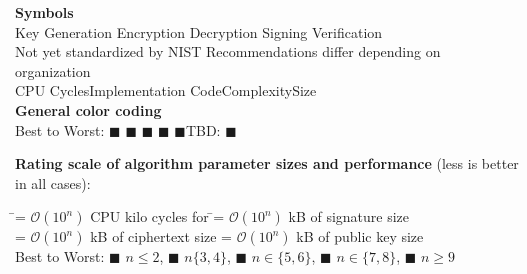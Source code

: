 \documentclass[11pt,english,a4paper, landscape]{scrartcl}
\begin{document}
	\begin{minipage}[t]{0.34\textwidth} %
		\tiny
		{\bfseries  Symbols}\\[0.5\baselineskip]
		\textcolor{themegreydark}{\faKey}\quad Key Generation\quad
		\textcolor{themegreydark}{\faLock}\quad Encryption\quad
		\textcolor{themegreydark}{\faUnlock}\quad Decryption\quad
		\textcolor{themegreydark}{\faPen}\quad Signing\quad
		\textcolor{themegreydark}{\faQuestionCircle}\quad Verification\\
		\textcolor{themegreydark}{\faCalendar}\quad Not yet standardized by NIST\quad
		\textcolor{themegreydark}{\faExclamationCircle}\quad Recommendations differ depending on organization\\
		\textcolor{themegreydark}{\faMicrochip}\quad CPU Cycles\quad\textcolor{themegreydark}{\faCode}\quad Implementation Code\quad{}\quad Complexity\quad{}\quad Size\\[0.25\baselineskip]
		{\bfseries  General color coding}\\[0.5\baselineskip]
		Best to Worst: \textcolor{themegreen}{$\blacksquare$} \textcolor{themeyellow}{$\blacksquare$} \textcolor{themeorange}{$\blacksquare$} \textcolor{themered}{$\blacksquare$} \textcolor{themered!65!black}{$\blacksquare$}\quad TBD: \textcolor{themeblue}{$\blacksquare$}
	\end{minipage}
	\hfill
	\begin{minipage}[t]{0.32\textwidth} %
		\tiny
		{\bfseries Rating scale of algorithm parameter sizes and performance} (less is better in all cases):
		\vspace{-0.75\baselineskip}
		\begin{tabbing}
			\== $\mathcal{O}(10^n)$ CPU kilo cycles for \faAsterisk\hspace{1cm}
			\== $\mathcal{O}(10^n)$ kB of signature size\\[0.5\baselineskip]
			\>= $\mathcal{O}(10^n)$ kB of ciphertext size
			\>= $\mathcal{O}(10^n)$ kB of public key size\\[\baselineskip]
			Best to Worst: \textcolor{themegreen}{$\blacksquare$} $n\leq2$, \textcolor{themeyellow}{$\blacksquare$} $n\{3,4\}$, \textcolor{themeorange}{$\blacksquare$} $n\in\{5,6\}$, \textcolor{themered}{$\blacksquare$} $n\in\{7,8\}$, \textcolor{themered!65!black}{$\blacksquare$} $n\geq9$
		\end{tabbing}
	\end{minipage}
\end{document}
